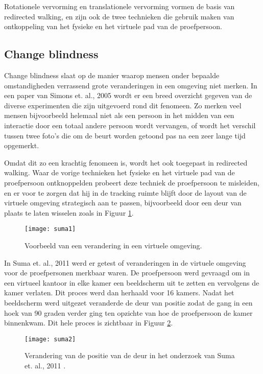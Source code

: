 Rotationele vervorming en translationele vervorming vormen de basis van
redirected walking, en zijn ook de twee technieken die gebruik maken van
ontkoppeling van het fysieke en het virtuele pad van de proefpersoon.


\subsection{Change blindness}
Change blindness slaat op de manier waarop mensen onder bepaalde omstandigheden
verrassend grote veranderingen in een omgeving niet merken. In een paper van
Simons et. al., 2005 \cite{simons05} wordt er een breed overzicht gegeven van de
diverse experimenten die zijn uitgevoerd rond dit fenomeen. Zo merken veel mensen
bijvoorbeeld helemaal niet als een persoon in het midden van een interactie door
een totaal andere persoon wordt vervangen\cite{simons98}, of wordt het verschil
tussen twee foto's die om de beurt worden getoond pas na een zeer lange tijd
opgemerkt\cite{rensink97}.

Omdat dit zo een krachtig fenomeen is, wordt het ook toegepast in redirected 
walking. Waar de vorige technieken het fysieke en het virtuele pad van de 
proefpersoon ontknoppelden probeert deze techniek de proefpersoon te misleiden, 
en er voor te zorgen dat hij in de tracking ruimte blijft door de layout van de 
virtuele omgeving strategisch aan te passen, bijvoorbeeld door een deur van
plaats te laten wisselen zoals in Figuur \ref{fig:suma1}.

\begin{figure}[h!]
    \centering
    \texttt{[image: suma1]}
    \caption{Voorbeeld van een verandering in een virtuele omgeving.\cite{suma11}}
    \label{fig:suma1}
\end{figure}

In Suma et. al., 2011 \cite{suma11} werd er getest of veranderingen in de 
virtuele omgeving voor de proefpersonen merkbaar waren. De proefpersoon werd
gevraagd om in een virtueel kantoor in elke kamer een beeldscherm uit te zetten
en vervolgens de kamer verlaten. Dit proces werd dan herhaald voor 16 kamers.
Nadat het beeldscherm werd uitgezet veranderde de deur van positie zodat de gang
in een hoek van 90 graden verder ging ten opzichte van hoe de proefpersoon de
kamer binnenkwam. Dit hele proces is zichtbaar in Figuur \ref{fig:suma2}.

\begin{figure}[h!]
    \centering
    \texttt{[image: suma2]}
    \caption{Verandering van de positie van de deur in het onderzoek van Suma et. 
    al., 2011 \cite{suma11}.}
    \label{fig:suma2}
\end{figure}

